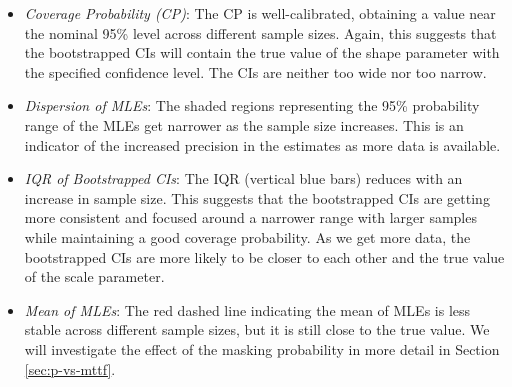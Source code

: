 \documentclass[
]{article}
\begin{document}
\begin{itemize}
\item
  \emph{Coverage Probability (CP)}: The CP is well-calibrated, obtaining
  a value near the nominal 95\% level across different sample sizes.
  Again, this suggests that the bootstrapped CIs will contain the true
  value of the shape parameter with the specified confidence level. The
  CIs are neither too wide nor too narrow.
\item
  \emph{Dispersion of MLEs}: The shaded regions representing the 95\%
  probability range of the MLEs get narrower as the sample size
  increases. This is an indicator of the increased precision in the
  estimates as more data is available.
\item
  \emph{IQR of Bootstrapped CIs}: The IQR (vertical blue bars) reduces
  with an increase in sample size. This suggests that the bootstrapped
  CIs are getting more consistent and focused around a narrower range
  with larger samples while maintaining a good coverage probability. As
  we get more data, the bootstrapped CIs are more likely to be closer to
  each other and the true value of the scale parameter.
\item
  \emph{Mean of MLEs}: The red dashed line indicating the mean of MLEs
  is less stable across different sample sizes, but it is still close to
  the true value. We will investigate the effect of the masking
  probability in more detail in Section \ref{sec:p-vs-mttf}.
\end{itemize}
\end{document}
